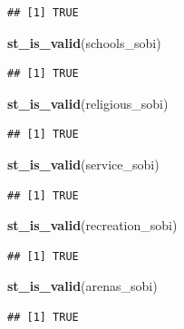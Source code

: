 \documentclass[
]{article}
\newenvironment{Shaded}{\begin{snugshade}}{\end{snugshade}}
\newcommand{\KeywordTok}[1]{\textcolor[rgb]{0.13,0.29,0.53}{\textbf{#1}}}
\newcommand{\NormalTok}[1]{#1}
\begin{document}
\begin{verbatim}
## [1] TRUE
\end{verbatim}

\begin{Shaded}
\begin{Highlighting}[]
\KeywordTok{st_is_valid}\NormalTok{(schools_sobi)}
\end{Highlighting}
\end{Shaded}

\begin{verbatim}
## [1] TRUE
\end{verbatim}

\begin{Shaded}
\begin{Highlighting}[]
\KeywordTok{st_is_valid}\NormalTok{(religious_sobi)}
\end{Highlighting}
\end{Shaded}

\begin{verbatim}
## [1] TRUE
\end{verbatim}

\begin{Shaded}
\begin{Highlighting}[]
\KeywordTok{st_is_valid}\NormalTok{(service_sobi)}
\end{Highlighting}
\end{Shaded}

\begin{verbatim}
## [1] TRUE
\end{verbatim}

\begin{Shaded}
\begin{Highlighting}[]
\KeywordTok{st_is_valid}\NormalTok{(recreation_sobi)}
\end{Highlighting}
\end{Shaded}

\begin{verbatim}
## [1] TRUE
\end{verbatim}

\begin{Shaded}
\begin{Highlighting}[]
\KeywordTok{st_is_valid}\NormalTok{(arenas_sobi)}
\end{Highlighting}
\end{Shaded}

\begin{verbatim}
## [1] TRUE
\end{verbatim}
\end{document}
